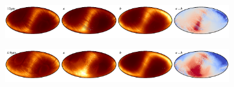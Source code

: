 \documentclass{aa}
\begin{document}
\begin{figure}
    \includegraphics[width=0.22\textwidth]{figs/zodi/zodi_05_tot.pdf}\includegraphics[width=0.22\textwidth]{figs/zodi/zodi_05_a.pdf}\includegraphics[width=0.22\textwidth]{figs/zodi/zodi_06_b.pdf}\includegraphics[width=0.22\textwidth]{figs/zodi/zodi_05_a-b.pdf}
    \vspace{-0.3cm}

    \includegraphics[width=0.22\textwidth]{figs/zodi/zodi_04_tot.pdf}\includegraphics[width=0.22\textwidth]{figs/zodi/zodi_04_a.pdf}\includegraphics[width=0.22\textwidth]{figs/zodi/zodi_07_b.pdf}\includegraphics[width=0.22\textwidth]{figs/zodi/zodi_04_a-b.pdf}
    \vspace{-0.3cm}


\end{figure}
\end{document}
